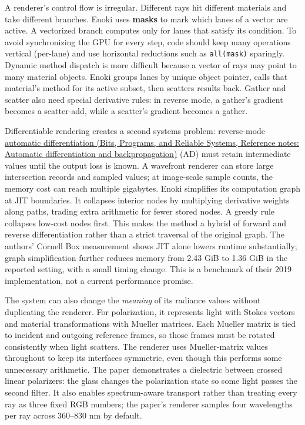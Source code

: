 A renderer's control flow is irregular. Different rays hit different materials and take different branches. Enoki uses \textbf{masks} to mark which lanes of a vector are active. A vectorized branch computes only for lanes that satisfy its condition. To avoid synchronizing the GPU for every step, code should keep many operations vertical (per-lane) and use horizontal reductions such as \texttt{all(mask)} sparingly. Dynamic method dispatch is more difficult because a vector of rays may point to many material objects. Enoki groups lanes by unique object pointer, calls that material's method for its active subset, then scatters results back. Gather and scatter also need special derivative rules: in reverse mode, a gather's gradient becomes a scatter-add, while a scatter's gradient becomes a gather.

Differentiable rendering creates a second systems problem: reverse-mode \href{../01-Bits-Programs-and-Reliable-Systems/main.pdf\#nameddest=appendix-40df0855b4a7}{automatic differentiation (Bits, Programs, and Reliable Systems, Reference notes: Automatic differentiation and backpropagation)} (AD) must retain intermediate values until the output loss is known. A wavefront renderer can store large intersection records and sampled values; at image-scale sample counts, the memory cost can reach multiple gigabytes. Enoki simplifies its computation graph at JIT boundaries. It collapses interior nodes by multiplying derivative weights along paths, trading extra arithmetic for fewer stored nodes. A greedy rule collapses low-cost nodes first. This makes the method a hybrid of forward and reverse differentiation rather than a strict traversal of the original graph. The authors' Cornell Box measurement shows JIT alone lowers runtime substantially; graph simplification further reduces memory from 2.43 GiB to 1.36 GiB in the reported setting, with a small timing change. This is a benchmark of their 2019 implementation, not a current performance promise.

The system can also change the \emph{meaning} of its radiance values without duplicating the renderer. For polarization, it represents light with Stokes vectors and material transformations with Mueller matrices. Each Mueller matrix is tied to incident and outgoing reference frames, so those frames must be rotated consistently when light scatters. The renderer uses Mueller-matrix values throughout to keep its interfaces symmetric, even though this performs some unnecessary arithmetic. The paper demonstrates a dielectric between crossed linear polarizers: the glass changes the polarization state so some light passes the second filter. It also enables spectrum-aware transport rather than treating every ray as three fixed RGB numbers; the paper's renderer samples four wavelengths per ray across 360--830 nm by default.

